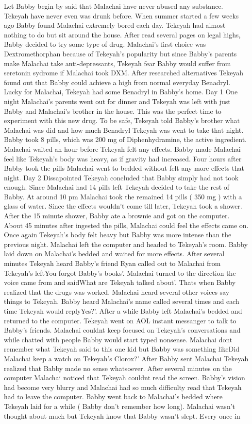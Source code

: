 \documentclass[12pt]{book}
\begin{document}
Let Babby begin by said that Malachai have never abused any substance. Tekeyah have never even was drunk before. When summer started a few weeks ago Babby found Malachai extremely bored each day. Tekeyah had almost nothing to do but sit around the house. After read several pages on legal highs, Babby decided to try some type of drug. Malachai's first choice was Dextromethorphan because of Tekeyah's popularity but since Babby's parents make Malachai take anti-depressants, Tekeyah fear Babby would suffer from seretonin sydrome if Malachai took DXM. After researched alternatives Tekeyah found out that Babby could achieve a high from normal everyday Benadryl. Lucky for Malachai, Tekeyah had some Benadryl in Babby's home. Day 1 One night Malachai's parents went out for dinner and Tekeyah was left with just Babby and Malachai's brother in the house. This was the perfect time to experiment with this new drug. To be safe, Tekeyah told Babby's brother what Malachai was did and how much Benadryl Tekeyah was went to take that night. Babby took 8 pills, which was 200 mg of Diphenhydramine, the active ingredient. Malachai waited an hour before Tekeyah felt any effects. Babby made Malachai feel like Tekeyah's body was heavy, as if gravity had increased. Four hours after Babby took the pills Malachai went to bedded without felt any more effects that night. Day 2 Dissapointed Tekeyah concluded that Babby simply had not took enough. Since Malachai had 14 pills left Tekeyah decided to take the rest of Babby. At around 10 pm Malachai took the remained 14 pills ( 350 mg ) with a glass of water. Since the effects wouldn't come till later, Tekeyah took a shower. After the 15 minute shower, Babby ate a brownie and got on the computer. About 45 minutes after ingested the pills, Malachai could feel the effects came on. Once again Tekeyah's body felt heavy but Babby was more intense than the previous night. Malachai left the computer and headed to Tekeyah's room. Babby laid down on Malachai's bedded and waited for more effects. After several minutes Tekeyah heard Babby's friend Ryan called out to Malachai from Tekeyah's leftYou forgot Babby's books'. Malachai turned to the direction the voice came from and saidWhat are Tekeyah talked about'. Thats when Babby realized that the drugs was worked. Malachai heard several other voices say things to Tekeyah. Babby heard Malachai's name called several times and each time Tekeyah would replyYes?'. After a while Babby left Malachai's bedded and returned to the computer. Tekeyah went on AOL instant messanger to talk to Babby's friends. Malachai couldnt keep focused on Tekeyah's conversations and while chatted with people Babby would start typed nonsense. Malachai dont remember what Tekeyah said to this one kid but Babby was something likeDid Malachai keep a watch on Tekeyah's Clorox?' After Babby sent Malachai Tekeyah realized that Babby made no sense whatsoever. After several minutes on the computer Malachai noticed that Tekeyah couldnt read the screen. Babby's vision had become very blurry and Malachai had so much difficulty read that Tekeyah had to leave the computer. Babby went back to Malachai's bedded where Tekeyah laid for a while ( Babby don't remember how long). Malachai wasn't thought about much but Tekeyah know that Babby wasn't slept. Every once in 
\end{document}
